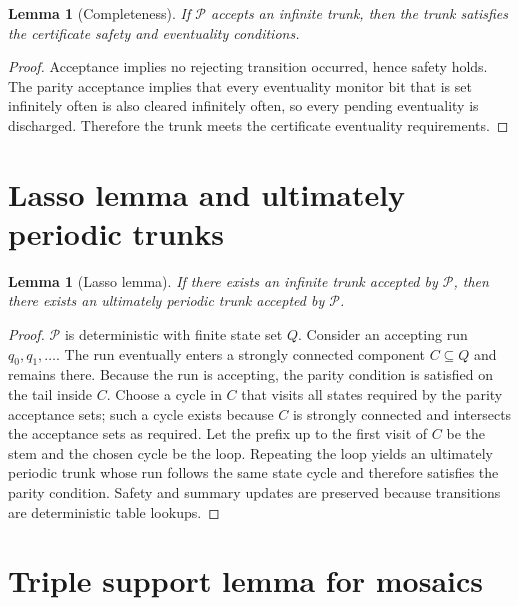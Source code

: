 \documentclass[11pt]{article}
\newtheorem{lemma}[theorem]{Lemma}
\begin{document}
\begin{lemma}[Completeness]
If $\mathcal{P}$ accepts an infinite trunk, then the trunk satisfies the
certificate safety and eventuality conditions.
\end{lemma}

\begin{proof}
Acceptance implies no rejecting transition occurred, hence safety holds. The
parity acceptance implies that every eventuality monitor bit that is set
infinitely often is also cleared infinitely often, so every pending eventuality
is discharged. Therefore the trunk meets the certificate eventuality
requirements.
\end{proof}

\section{Lasso lemma and ultimately periodic trunks}
\label{sec:lasso}

\begin{lemma}[Lasso lemma]
If there exists an infinite trunk accepted by $\mathcal{P}$, then there exists
an ultimately periodic trunk accepted by $\mathcal{P}$.
\end{lemma}

\begin{proof}
$\mathcal{P}$ is deterministic with finite state set $Q$. Consider an accepting
run $q_0,q_1,\dots$. The run eventually enters a strongly connected component
$C\subseteq Q$ and remains there. Because the run is accepting, the parity
condition is satisfied on the tail inside $C$. Choose a cycle in $C$ that
visits all states required by the parity acceptance sets; such a cycle exists
because $C$ is strongly connected and intersects the acceptance sets as
required. Let the prefix up to the first visit of $C$ be the stem and the
chosen cycle be the loop. Repeating the loop yields an ultimately periodic
trunk whose run follows the same state cycle and therefore satisfies the
parity condition. Safety and summary updates are preserved because transitions
are deterministic table lookups.
\end{proof}

\section{Triple support lemma for mosaics}
\label{sec:triple-support}
\end{document}
